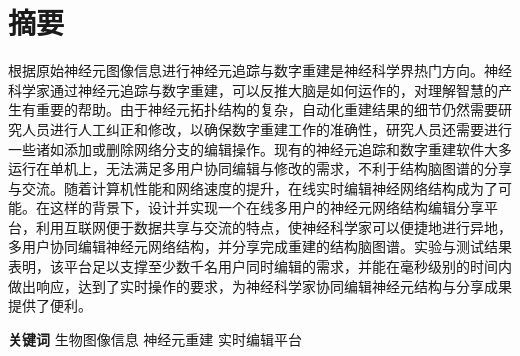 \chapter{摘要}

根据原始神经元图像信息进行神经元追踪与数字重建是神经科学界热门方向。神经科学家通过神经元追踪与数字重建，可以反推大脑是如何运作的，对理解智慧的产生有重要的帮助。由于神经元拓扑结构的复杂，自动化重建结果的细节仍然需要研究人员进行人工纠正和修改，以确保数字重建工作的准确性，研究人员还需要进行一些诸如添加或删除网络分支的编辑操作。现有的神经元追踪和数字重建软件大多运行在单机上，无法满足多用户协同编辑与修改的需求，不利于结构脑图谱的分享与交流。随着计算机性能和网络速度的提升，在线实时编辑神经网络结构成为了可能。在这样的背景下，设计并实现一个在线多用户的神经元网络结构编辑分享平台，利用互联网便于数据共享与交流的特点，使神经科学家可以便捷地进行异地，多用户协同编辑神经元网络结构，并分享完成重建的结构脑图谱。实验与测试结果表明，该平台足以支撑至少数千名用户同时编辑的需求，并能在毫秒级别的时间内做出响应，达到了实时操作的要求，为神经科学家协同编辑神经元结构与分享成果提供了便利。

{
    \vspace{1em}
    \setlength{\parindent}{0em}
    \textbf{关键词} \; 生物图像信息 \; 神经元重建 \; 实时编辑平台 \par
}